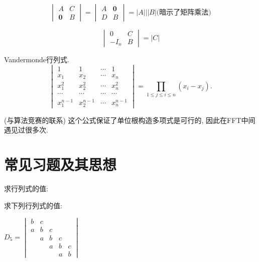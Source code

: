 \[
\begin{vmatrix}A & C\\
\mathbf{0} & B
\end{vmatrix}=\begin{vmatrix}A & \mathbf{0}\\
D & B
\end{vmatrix}=|A|||B|(\text{暗示了矩阵乘法)}
\]

\[
\begin{vmatrix}0 & C\\
-I_{n} & B
\end{vmatrix}=|C|
\]

Vandermonde行列式.
\[
\begin{vmatrix}1 & 1 & \cdots & 1\\
x_{1} & x_{2} & \cdots & x_{n}\\
x_{1}^{2} & x_{2}^{2} & \cdots & x_{n}^{2}\\
\cdots & \cdots & \cdots & \cdots\\
x_{1}^{n-1} & x_{2}^{n-1} & \cdots & x_{n}^{n-1}
\end{vmatrix}=\prod_{1\leq j\leq i\leq n}(x_{i}-x_{j}).
\]

(与算法竞赛的联系) 这个公式保证了单位根构造多项式是可行的, 因此在FFT中间遇见过很多次.

\section{常见习题及其思想}

求行列式的值: 

求下列行列式的值: 
\begin{problem}
\label{prob:poly1}$D_{5}=\begin{vmatrix}b & c\\
a & b & c\\
 & a & b & c\\
 &  & a & b & c\\
 &  &  & a & b
\end{vmatrix}$
\end{problem}

